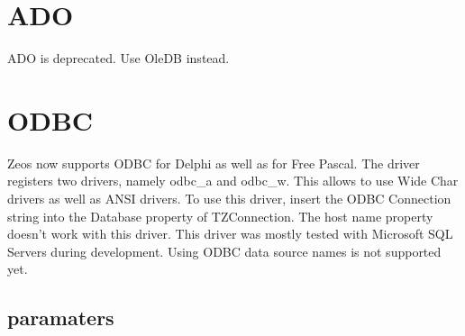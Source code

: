 \documentclass[a4paper,12pt,oneside]{article}
\begin{document}
\section{ADO}
ADO is deprecated. Use OleDB instead.

\section{ODBC}
Zeos now supports ODBC for Delphi as well as for Free Pascal.
The driver registers two drivers, namely odbc\_a and odbc\_w.
This allows to use Wide Char drivers as well as ANSI drivers.
To use this driver, insert the ODBC Connection string into the Database property of TZConnection.
The host name property doesn't work with this driver.
This driver was mostly tested with Microsoft SQL Servers during development.
Using ODBC data source names is not supported yet.

\subsection{paramaters}
\end{document}
